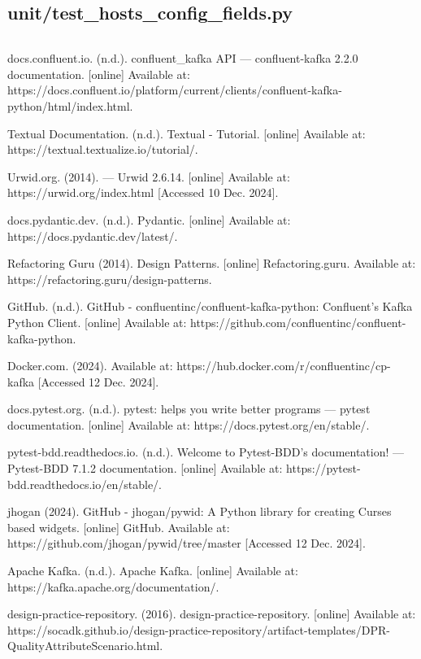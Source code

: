 \documentclass[10pt , a4paper]{report}
\newenvironment{code}{\captionsetup{type=listing}}{}
\begin{document}
\subsection{unit/test\_hosts\_config\_fields.py}
\begin{code}
  \inputminted[fontsize=\small]{Python}{../tests/unit/test_hosts_config_fields.py}
\end{code}

\renewcommand{\bibname}{References}
\begin{thebibliography}{00}
 docs.confluent.io. (n.d.). confluent\_kafka API — confluent-kafka 2.2.0 documentation. [online] Available at: https://docs.confluent.io/platform/current/clients/confluent-kafka-python/html/index.html.

 Textual Documentation. (n.d.). Textual - Tutorial. [online] Available at: https://textual.textualize.io/tutorial/.

 Urwid.org. (2014). — Urwid 2.6.14. [online] Available at: https://urwid.org/index.html [Accessed 10 Dec. 2024].

 docs.pydantic.dev. (n.d.). Pydantic. [online] Available at: https://docs.pydantic.dev/latest/.

 Refactoring Guru (2014). Design Patterns. [online] Refactoring.guru. Available at: https://refactoring.guru/design-patterns.

 GitHub. (n.d.). GitHub - confluentinc/confluent-kafka-python: Confluent’s Kafka Python Client. [online] Available at: https://github.com/confluentinc/confluent-kafka-python.


 Docker.com. (2024). Available at: https://hub.docker.com/r/confluentinc/cp-kafka [Accessed 12 Dec. 2024].

 docs.pytest.org. (n.d.). pytest: helps you write better programs — pytest documentation. [online] Available at: https://docs.pytest.org/en/stable/.

 pytest-bdd.readthedocs.io. (n.d.). Welcome to Pytest-BDD’s documentation! — Pytest-BDD 7.1.2 documentation. [online] Available at: https://pytest-bdd.readthedocs.io/en/stable/.

 jhogan (2024). GitHub - jhogan/pywid: A Python library for creating Curses based widgets. [online] GitHub. Available at: https://github.com/jhogan/pywid/tree/master [Accessed 12 Dec. 2024].

 Apache Kafka. (n.d.). Apache Kafka. [online] Available at: https://kafka.apache.org/documentation/.

 design-practice-repository. (2016). design-practice-repository. [online] Available at: https://socadk.github.io/design-practice-repository/artifact-templates/DPR-QualityAttributeScenario.html.

\end{thebibliography}
\end{document}

